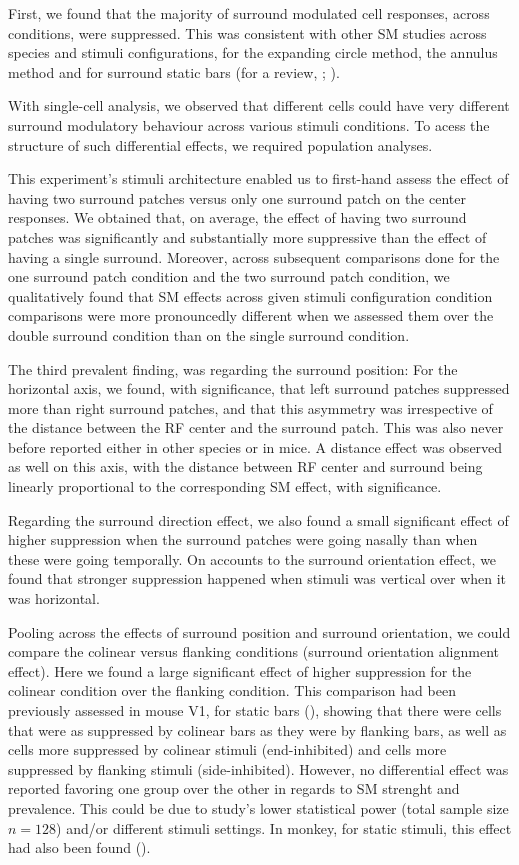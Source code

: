 First, we found that the majority of surround modulated cell responses, across conditions, were suppressed. This was consistent with other SM studies across species and stimuli configurations, for the expanding circle method, the annulus method and for surround static bars (for a review, \cite{Angelucci2014}; \cite{Samonds2017}). 

With single-cell analysis, we observed that different cells could have very different surround modulatory behaviour across various stimuli conditions. To acess the structure of such differential effects, we required population analyses.

This experiment's stimuli architecture enabled us to first-hand assess the effect of having two surround patches versus only one surround patch on the center responses. We obtained that, on average, the effect of having two surround patches was significantly and substantially more suppressive than the effect of having a single surround. Moreover, across subsequent comparisons done for the one surround patch condition and the two surround patch condition, we qualitatively found that SM effects across given stimuli configuration condition comparisons were more pronouncedly different when we assessed them over the double surround condition than on the single surround condition.

The third prevalent finding, was regarding the surround position: For the horizontal axis, we found, with significance, that left surround patches suppressed more than right surround patches, and that this asymmetry was irrespective of the distance between the RF center and the surround patch. This was also never before reported either in other species or in mice. A distance effect was observed as well on this axis, with the distance between RF center and surround being linearly proportional to the corresponding SM effect, with significance.

Regarding the surround direction effect, we also found a small significant effect of higher suppression when the surround patches were going nasally than when these were going temporally. On accounts to the surround orientation effect, we found that stronger suppression happened when stimuli was vertical over when it was horizontal.

Pooling across the effects of surround position and surround orientation, we could compare the colinear versus flanking conditions (surround orientation alignment effect). Here we found a large significant effect of higher suppression for the colinear condition over the flanking condition. This comparison had been previously assessed in mouse V1, for static bars (\cite{Samonds2017}), showing that there were cells that were as suppressed by colinear bars as they were by flanking bars, as well as cells more suppressed by colinear stimuli (end-inhibited) and cells more suppressed by flanking stimuli (side-inhibited). However, no differential effect was reported favoring one group over the other in regards to SM strenght and prevalence. This could be due to \cite{Samonds2017} study's lower statistical power (total sample size $n=128$) and/or different stimuli settings. In monkey, for static stimuli, this effect had also been found (\cite{??}).

